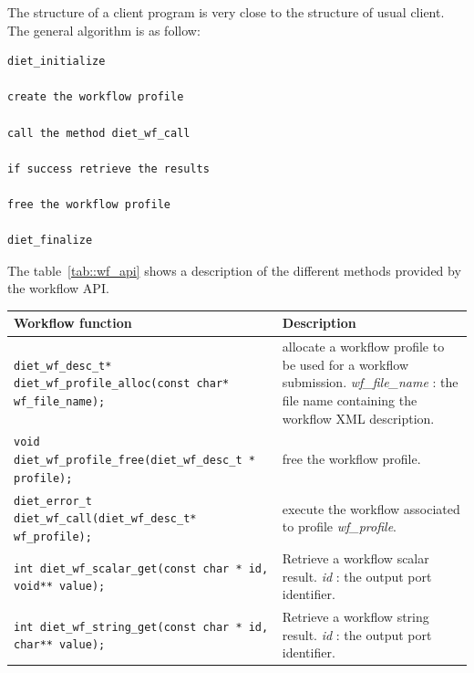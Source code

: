 The structure of a client program is very close to the structure of
usual \diet client. The general algorithm is as follow:

\begin{verbatim}
diet_initialize

create the workflow profile

call the method diet_wf_call

if success retrieve the results

free the workflow profile

diet_finalize
\end{verbatim}

The table~\ref{tab::wf_api} shows a description of the different
methods provided by the \diet workflow API. 

\begin{table}[htbp]
  \centering
  \begin{tabular}[htbp]{|p{8cm}|p{7.5cm}|}\hline
    Workflow function & Description \\\hline
    \texttt{diet\_wf\_desc\_t*  \newline
      diet\_wf\_profile\_alloc(const char* wf\_file\_name);} 
    &
    allocate a workflow profile to be used for a workflow submission.\newline
    \textit{wf\_file\_name} : the file name containing the workflow XML description.
    \\\hline
    \texttt{void  \newline
      diet\_wf\_profile\_free(diet\_wf\_desc\_t * profile);} 
    &
    free the workflow profile.
    \\\hline
    \texttt{diet\_error\_t \newline
      diet\_wf\_call(diet\_wf\_desc\_t* wf\_profile);} 
    &
    execute the workflow associated to profile \textit{wf\_profile}.
    \\\hline
    \texttt{int   \newline
      diet\_wf\_scalar\_get(const char * id, void** value);} 
    &
    Retrieve a workflow scalar result. \newline
    \textit{id} : the output port identifier.
    \\\hline
    \texttt{int   \newline
      diet\_wf\_string\_get(const char * id, char** value);} 
    &
    Retrieve a workflow string result. \newline
    \textit{id} : the output port identifier.
    \\\hline

\end{tabular}
\end{table}
